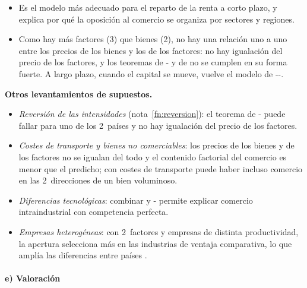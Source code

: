 \documentclass[11pt]{article}
\begin{document}
\begin{itemize}
\item Es el modelo más adecuado para el reparto de la renta a corto plazo, y explica por qué la oposición al comercio se organiza por sectores y regiones.
\item Como hay más factores (3) que bienes (2), no hay una relación uno a uno entre los precios de los bienes y los de los factores: no hay igualación del precio de los factores, y los teoremas de - y de  no se cumplen en su forma fuerte. A largo plazo, cuando el capital se mueve, vuelve el modelo de --.
\end{itemize}

\begin{anotaciones}
\textbf{Otros levantamientos de supuestos.}
\begin{itemize}

\item \emph{Reversión de las intensidades} (nota~\ref{fn:reversion}): el teorema de - puede fallar para uno de los 2~países y no hay igualación del precio de los factores\nocite{Minhas1962Homohypallagic}.
\item \emph{Costes de transporte y bienes no comerciables}: los precios de los bienes y de los factores no se igualan del todo y el contenido factorial del comercio es menor que el predicho; con costes de transporte puede haber incluso comercio en las 2~direcciones de un bien voluminoso\nocite{Gandolfo2014International}.
\item \emph{Diferencias tecnológicas}: combinar  y - permite explicar comercio intraindustrial con competencia perfecta\nocite{Davis1995Intra}\nocite{Gandolfo2014International}.
\item \emph{Empresas heterogéneas}: con 2~factores y empresas de distinta productividad, la apertura selecciona más en las industrias de ventaja comparativa, lo que amplía las diferencias entre países\nocite{BernardReddingSchott2007Comparative} .
\end{itemize}
\end{anotaciones}

\paragraph{e) Valoración}\label{sec:hos-valoracion}
\end{document}
